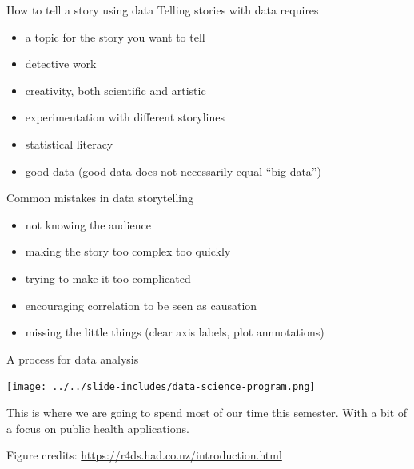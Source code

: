 \documentclass[table]{beamer}\usepackage[]{graphicx}\usepackage[]{color}
\begin{document}


\begin{frame}{How to tell a story using data}
Telling stories with data requires
\begin{itemize}
    \item a topic for the story you want to tell
    \item detective work
    \item creativity, both scientific and artistic
    \item experimentation with different storylines
    \item statistical literacy
    \item good data (good data does not necessarily equal ``big data'')
\end{itemize}

\end{frame}



\begin{frame}{Common mistakes in data storytelling}

\begin{itemize}
    \item not knowing the audience
    \item making the story too complex too quickly
    \item trying to make it too complicated
    \item encouraging correlation to be seen as causation
    \item missing the little things (clear axis labels, plot annnotations)
\end{itemize}

\end{frame}




\begin{frame}{A process for data analysis}

\texttt{[image: ../../slide-includes/data-science-program.png]}

\bigskip

This is where we are going to spend most of our time this semester. With a bit of a focus on public health applications. 

\bigskip

 \tiny Figure credits: \url{https://r4ds.had.co.nz/introduction.html}

\end{frame}
\end{document}
